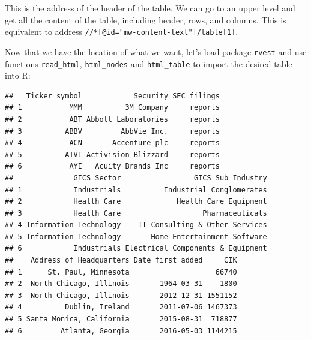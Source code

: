 \documentclass[11pt,]{book}
\newenvironment{Shaded}{\begin{snugshade}}{\end{snugshade}}
\newcommand{\KeywordTok}[1]{\textcolor[rgb]{0.27,0.27,0.27}{\textbf{#1}}}
\newcommand{\DataTypeTok}[1]{\textcolor[rgb]{0.27,0.27,0.27}{#1}}
\newcommand{\DecValTok}[1]{\textcolor[rgb]{0.06,0.06,0.06}{#1}}
\newcommand{\StringTok}[1]{\textcolor[rgb]{0.5,0.5,0.5}{#1}}
\newcommand{\CommentTok}[1]{\textcolor[rgb]{0.56,0.35,0.01}{\textit{#1}}}
\newcommand{\NormalTok}[1]{#1}
\begin{document}
This is the address of the header of the table. We can go to an upper
level and get all the content of the table, including header, rows, and
columns. This is equivalent to address
\texttt{//*{[}@id="mw-content-text"{]}/table{[}1{]}}.

Now that we have the location of what we want, let's load package
\texttt{rvest} \citep{rvest} and use functions \texttt{read\_html},
\texttt{html\_nodes} and \texttt{html\_table} to import the desired
table into R:  
 

\begin{Shaded}
\end{Shaded}

\begin{verbatim}
##   Ticker symbol            Security SEC filings
## 1           MMM          3M Company     reports
## 2           ABT Abbott Laboratories     reports
## 3          ABBV         AbbVie Inc.     reports
## 4           ACN       Accenture plc     reports
## 5          ATVI Activision Blizzard     reports
## 6           AYI   Acuity Brands Inc     reports
##              GICS Sector                 GICS Sub Industry
## 1            Industrials          Industrial Conglomerates
## 2            Health Care             Health Care Equipment
## 3            Health Care                   Pharmaceuticals
## 4 Information Technology    IT Consulting & Other Services
## 5 Information Technology       Home Entertainment Software
## 6            Industrials Electrical Components & Equipment
##    Address of Headquarters Date first added     CIK
## 1      St. Paul, Minnesota                    66740
## 2  North Chicago, Illinois       1964-03-31    1800
## 3  North Chicago, Illinois       2012-12-31 1551152
## 4          Dublin, Ireland       2011-07-06 1467373
## 5 Santa Monica, California       2015-08-31  718877
## 6         Atlanta, Georgia       2016-05-03 1144215
\end{verbatim}
\end{document}
